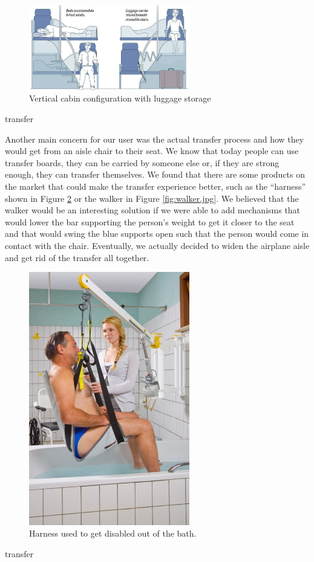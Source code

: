 \begin{figure}[h]
  \centering
     \includegraphics[width=7cm]{images/vertical_with_luggage.jpg}
   \caption{Vertical cabin configuration with luggage storage} %
  \label{fig:vertical_with_luggage}
\end{figure} 
transfer

Another main concern for our user was the actual transfer process and how they would get from an aisle chair to their seat. We know that today people can use transfer boards, they can be carried by someone else or, if they are strong enough, they can transfer themselves. We found that there are some products on the market that could make the transfer experience better, such as the “harness” shown in Figure \ref{fig:harness.jpg} or the walker in Figure \ref{fig:walker.jpg}. We believed that the walker would be an interesting solution if we were able to add mechanisms  that would lower the bar supporting the person’s weight to get it closer to the seat and that would swing the blue supports open such that the person would come in contact with the chair. Eventually, we actually decided to widen the airplane aisle and get rid of the transfer all together. 

\begin{figure}[h]
  \centering
     \includegraphics[width=7cm]{images/harness.jpg}
   \caption{Harness used to get disabled out of the bath.}%
  \label{fig:harness.jpg}
\end{figure} 
transfer

